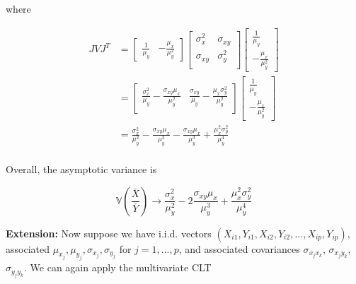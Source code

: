 \documentclass{article}
\newcommand{\Var}{\mathbb{V}}
\theoremstyle{definition}
\begin{document}
where


\begin{align*}
    JVJ^T &= \begin{bmatrix}
\frac{1}{\mu_y} &  -\frac{\mu_x}{\mu_y^2}
\end{bmatrix} 
\begin{bmatrix}
    \sigma_x^2   &  \sigma_{xy}\\
    \sigma_{xy} & \sigma_y^2  \\
\end{bmatrix}
\begin{bmatrix}
\frac{1}{\mu_y} \\ -\frac{\mu_x}{\mu_y^2}
\end{bmatrix} \\ 
&= %
\begin{bmatrix}
  \frac{\sigma_x^2}{\mu_y} - \frac{\sigma_{xy}\mu_x}{\mu_y^2}  & \frac{\sigma_{xy}}{\mu_y} - \frac{\mu_x\sigma_{y}^2}{\mu_y^2} \\
\end{bmatrix}
\begin{bmatrix}
\frac{1}{\mu_y} \\ -\frac{\mu_x}{\mu_y^2}
\end{bmatrix} \\ 
&=
  \frac{\sigma_x^2}{\mu_y^2} - \frac{\sigma_{xy}\mu_x}{\mu_y^3}  - \frac{\sigma_{xy}\mu_x}{\mu_y^3} + \frac{\mu_x^2\sigma_{y}^2}{\mu_y^4} \\
\end{align*}

Overall, the asymptotic variance is

\begin{equation}\label{eq-ratiovar}
  \Var\left(\frac{\bar{X}}{\bar{Y}}\right)\rightarrow  \frac{\sigma_x^2}{\mu_y^2} - 2\frac{\sigma_{xy}\mu_x}{\mu_y^3}  + \frac{\mu_x^2\sigma_{y}^2}{\mu_y^4}
\end{equation}


\newpage 
\noindent \textbf{Extension:} Now suppose we have i.i.d. vectors $(X_{i1},Y_{i1},X_{i2},Y_{i2},...,X_{ip},Y_{ip})$, associated $\mu_{x_j},\mu_{y_j},\sigma_{x_j},\sigma_{y_j}$ for $j=1,...,p$, and associated covariances $\sigma_{x_jx_k}$, $\sigma_{x_jy_k}$, $\sigma_{y_jy_k}$. We can again apply the multivariate CLT
\end{document}

